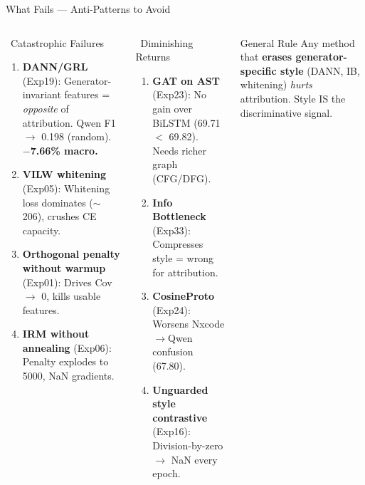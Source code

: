 \documentclass[aspectratio=169, 10pt]{beamer}
\begin{document}
\begin{frame}{What Fails --- Anti-Patterns to Avoid}
\vspace{-0.15cm}
\begin{columns}[T]
\begin{alertblock}{\ Catastrophic Failures}
\small
\begin{enumerate}\setlength\itemsep{4pt}
    \item \textbf{DANN/GRL} (Exp19): Generator-invariant features = \emph{opposite} of attribution. Qwen F1 $\to$ 0.198 (random). \textbf{$-$7.66\% macro.}
    \item \textbf{VILW whitening} (Exp05): Whitening loss dominates ($\sim$206), crushes CE capacity.
    \item \textbf{Orthogonal penalty without warmup} (Exp01): Drives Cov $\to$ 0, kills usable features.
    \item \textbf{IRM without annealing} (Exp06): Penalty explodes to 5000, NaN gradients.
\end{enumerate}
\end{alertblock}

\begin{block}{\ Diminishing Returns}
\small
\begin{enumerate}\setlength\itemsep{4pt}
    \item \textbf{GAT on AST} (Exp23): No gain over BiLSTM (69.71 $<$ 69.82). Needs richer graph (CFG/DFG).
    \item \textbf{Info Bottleneck} (Exp33): Compresses style = wrong for attribution.
    \item \textbf{CosineProto} (Exp24): Worsens Nxcode$\to$Qwen confusion (67.80).
    \item \textbf{Unguarded style contrastive} (Exp16): Division-by-zero $\to$ NaN every epoch.
\end{enumerate}
\end{block}

\begin{exampleblock}{\scriptsize General Rule}
\scriptsize
Any method that \textbf{erases generator-specific style} (DANN, IB, whitening) \emph{hurts} attribution. Style IS the discriminative signal.
\end{exampleblock}
\end{columns}
\end{frame}
\end{document}
